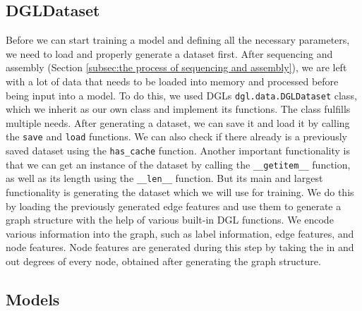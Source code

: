 \documentclass[times, utf8, diplomski, english]{fer_eng}
\begin{document}
\subsection{DGLDataset}

Before we can start training a model and defining all the necessary parameters, we need to load and properly generate a dataset first. After sequencing and assembly (Section \ref{subsec:the process of sequencing and assembly}), we are left with a lot of data that needs to be loaded into memory and processed before being input into a model. To do this, we used DGLs \texttt{dgl.data.DGLDataset} class, which we inherit as our own class and implement its functions. The class fulfills multiple needs. After generating a dataset, we can save it and load it by calling the \texttt{save} and \texttt{load} functions. We can also check if there already is a previously saved dataset using the \texttt{has\_cache} function. Another important functionality is that we can get an instance of the dataset by calling the \texttt{\_\_getitem\_\_} function, as well as its length using the \texttt{\_\_len\_\_} function. But its main and largest functionality is generating the dataset which we will use for training. We do this by loading the previously generated edge features and use them to generate a graph structure with the help of various built-in DGL functions. We encode various information into the graph, such as label information, edge features, and node features. Node features are generated during this step by taking the in and out degrees of every node, obtained after generating the graph structure.

\subsection{Models}
\end{document}
